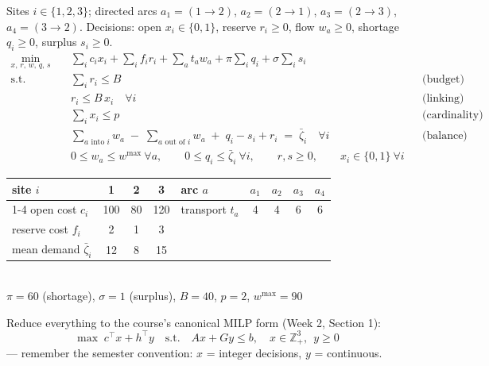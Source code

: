 \documentclass[10pt]{article}
\begin{document}
\medskip
Sites $i \in \{1,2,3\}$; directed arcs
$a_1 = (1\!\to\!2)$, $a_2 = (2\!\to\!1)$, $a_3 = (2\!\to\!3)$, $a_4 = (3\!\to\!2)$.
Decisions: open $x_i \in \{0,1\}$, reserve $r_i \ge 0$, flow $w_a \ge 0$, shortage
$q_i \ge 0$, surplus $s_i \ge 0$.
\[
\begin{aligned}
  \min_{x,\,r,\,w,\,q,\,s}\quad
    & \textstyle\sum_i c_i x_i + \sum_i f_i r_i + \sum_a t_a w_a
      + \pi \sum_i q_i + \sigma \sum_i s_i \\
  \text{s.t.}\quad
    & \textstyle\sum_i r_i \le B
      && \text{(budget)} \\
    & r_i \le B\, x_i \quad \forall i
      && \text{(linking)} \\
    & \textstyle\sum_i x_i \le p
      && \text{(cardinality)} \\
    & \textstyle\sum_{a \text{ into } i} w_a \;-\; \sum_{a \text{ out of } i} w_a
      \;+\; q_i - s_i + r_i \;=\; \bar\zeta_i \quad \forall i
      && \text{(balance)} \\
    & 0 \le w_a \le w^{\max} \ \forall a, \qquad
      0 \le q_i \le \bar\zeta_i \ \forall i, \qquad
      r, s \ge 0, \qquad x_i \in \{0,1\} \ \forall i
\end{aligned}
\]
\begin{center}
\begin{tabular}{l|ccc@{\qquad}l|cccc}
 site $i$          & 1 & 2 & 3 & arc $a$ & $a_1$ & $a_2$ & $a_3$ & $a_4$ \\ \cline{1-4}\cline{5-9}
 open cost $c_i$   & 100 & 80 & 120 & transport $t_a$ & 4 & 4 & 6 & 6 \\
 reserve cost $f_i$ & 2 & 1 & 3 & & & & & \\
 mean demand $\bar\zeta_i$ & 12 & 8 & 15 & & & & & \\
\end{tabular}\\[3pt]
$\pi = 60$ (shortage), \quad $\sigma = 1$ (surplus), \quad $B = 40$, \quad $p = 2$,
\quad $w^{\max} = 90$
\end{center}

Reduce everything to the course's canonical MILP form (Week 2, Section 1):
\[
  \max\; c^{\top}x + h^{\top}y
  \quad \text{s.t.} \quad Ax + Gy \le b,
  \quad x \in \mathbb{Z}^{3}_{+}, \ \ y \ge 0
\]
--- remember the semester convention: $x$ = integer decisions, $y$ = continuous.
\end{document}
